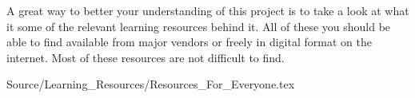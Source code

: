 

A great way to better your understanding of this project is to take a look at what it some of the relevant learning resources behind it. All of these you should be able to find available from major vendors or freely in digital format on the internet. Most of these resources are not difficult to find.

\component Source/Learning_Resources/Resources_For_Everyone.tex


